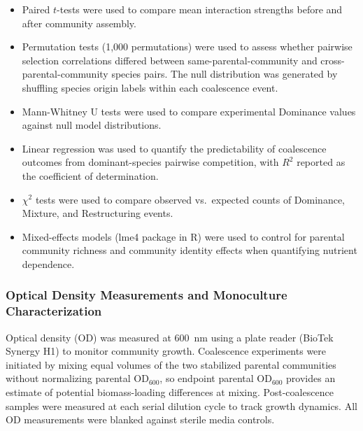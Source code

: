\begin{itemize}
    \item Paired $t$-tests were used to compare mean interaction strengths before and after community assembly.
    \item Permutation tests (1,000 permutations) were used to assess whether pairwise selection correlations differed between same-parental-community and cross-parental-community species pairs. The null distribution was generated by shuffling species origin labels within each coalescence event.
    \item Mann-Whitney U tests were used to compare experimental Dominance values against null model distributions.
    \item Linear regression was used to quantify the predictability of coalescence outcomes from dominant-species pairwise competition, with $R^2$ reported as the coefficient of determination.
    \item $\chi^2$ tests were used to compare observed vs.\ expected counts of Dominance, Mixture, and Restructuring events.
    \item Mixed-effects models (lme4 package in R) were used to control for parental community richness and community identity effects when quantifying nutrient dependence.
\end{itemize}


\subsubsection*{Optical Density Measurements and Monoculture Characterization}
\label{sec:suppl:od}

Optical density (OD) was measured at 600~nm using a plate reader (BioTek Synergy H1) to monitor community growth. Coalescence experiments were initiated by mixing equal volumes of the two stabilized parental communities without normalizing parental OD$_{600}$, so endpoint parental OD$_{600}$ provides an estimate of potential biomass-loading differences at mixing. Post-coalescence samples were measured at each serial dilution cycle to track growth dynamics. All OD measurements were blanked against sterile media controls.

